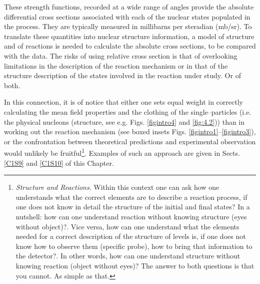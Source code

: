 These strength functions, recorded at a wide range of angles provide the absolute differential cross sections associated with each of the nuclear states populated in the process. They are  typically measured in millibarns per  steradian (mb/sr). To translate these quantities into nuclear structure information, a model of structure and of reactions is needed to calculate the absolute cross sections, to be compared with the data. The risks of using relative cross section is that of overlooking limitations in the description of the reaction mechanism or in that of the structure description of the states involved in the reaction under study. Or of both.

In this connection, it is of notice that either one sets equal weight in correctly calculating the mean field properties and the clothing of the single--particles (i.e. the physical nucleons (structure, see e.g. Figs. \ref{figintro4} and \ref{fig:4.2})) than in working out the reaction mechanism (see boxed insets Figs. \ref{figintro1}--\ref{figintro3}), or the confrontation between theoretical predictions and experimental observation would unlikely be fruitful\footnote{\textit{Structure and Reactions}. Within this context one can ask how one understands what the correct elements are to describe a reaction process, if one does not know in detail the structure of the initial and final states? In a nutshell: how can one understand reaction without knowing structure (eyes without object)?. 
Vice versa, how can one understand what the elements needed for a correct description of the structure of levels is, if one does not know how to observe them (specific probe), how to bring that information to the detector?. In other words, how can one understand structure without knowing reaction (object without eyes)? The answer to both questions is that you cannot. As simple as that.}. Examples of such an approach are given in Sects. \ref{C1S9} and \ref{C1S10} of this Chapter.


